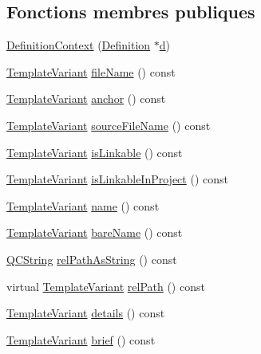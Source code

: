 \subsection*{Fonctions membres publiques}
\begin{DoxyCompactItemize}
\item 
\hyperlink{class_definition_context_aa3e74d6a17ccd5f9333e05949740d7c2}{Definition\+Context} (\hyperlink{class_definition}{Definition} $\ast$\hyperlink{060__command__switch_8tcl_af43f4b1f0064a33b2d662af9f06d3a00}{d})
\item 
\hyperlink{class_template_variant}{Template\+Variant} \hyperlink{class_definition_context_ac8f0f6e7f49beb04efc33f7a36af57a7}{file\+Name} () const 
\item 
\hyperlink{class_template_variant}{Template\+Variant} \hyperlink{class_definition_context_a31f335b6d5dc0872d03661ff8f1e0680}{anchor} () const 
\item 
\hyperlink{class_template_variant}{Template\+Variant} \hyperlink{class_definition_context_a14848d092f4061783e8cc2b63fa23be8}{source\+File\+Name} () const 
\item 
\hyperlink{class_template_variant}{Template\+Variant} \hyperlink{class_definition_context_a9888366f0b8eb2ff14e65943c5b67ac2}{is\+Linkable} () const 
\item 
\hyperlink{class_template_variant}{Template\+Variant} \hyperlink{class_definition_context_ad39ecbadcdfd8f533b62900fa7e0e173}{is\+Linkable\+In\+Project} () const 
\item 
\hyperlink{class_template_variant}{Template\+Variant} \hyperlink{class_definition_context_a8302b8da7295efda0cb77a1b6003a2d3}{name} () const 
\item 
\hyperlink{class_template_variant}{Template\+Variant} \hyperlink{class_definition_context_a31551d911a1e0e610c0295eb5655e997}{bare\+Name} () const 
\item 
\hyperlink{class_q_c_string}{Q\+C\+String} \hyperlink{class_definition_context_ac7e3045a83c65183a3ea9d7baaeae118}{rel\+Path\+As\+String} () const 
\item 
virtual \hyperlink{class_template_variant}{Template\+Variant} \hyperlink{class_definition_context_a971678d6876365365f4f1de3fc9d49cc}{rel\+Path} () const 
\item 
\hyperlink{class_template_variant}{Template\+Variant} \hyperlink{class_definition_context_ad70241702b5f52beb8f7f80c77a2d3a5}{details} () const 
\item 
\hyperlink{class_template_variant}{Template\+Variant} \hyperlink{class_definition_context_aec50b29543ed7be952c6cbcb33ddb4d1}{brief} () const 

\end{DoxyCompactItemize}
